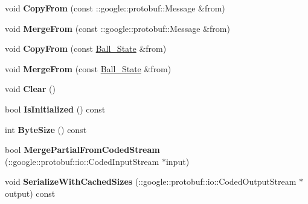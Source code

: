 \begin{DoxyCompactItemize}
\item 
void {\bfseries Copy\+From} (const \+::google\+::protobuf\+::\+Message \&from)\hypertarget{classvss__state_1_1Ball__State_a1b6e1fc62b0ed7f4a56f51107c2dea0c}{}\label{classvss__state_1_1Ball__State_a1b6e1fc62b0ed7f4a56f51107c2dea0c}

\item 
void {\bfseries Merge\+From} (const \+::google\+::protobuf\+::\+Message \&from)\hypertarget{classvss__state_1_1Ball__State_a23b0aa5fb0ead3fa0eb1d49f044a4108}{}\label{classvss__state_1_1Ball__State_a23b0aa5fb0ead3fa0eb1d49f044a4108}

\item 
void {\bfseries Copy\+From} (const \hyperlink{classvss__state_1_1Ball__State}{Ball\+\_\+\+State} \&from)\hypertarget{classvss__state_1_1Ball__State_abc6d9bde7cd19d33f5592fe7e89958f2}{}\label{classvss__state_1_1Ball__State_abc6d9bde7cd19d33f5592fe7e89958f2}

\item 
void {\bfseries Merge\+From} (const \hyperlink{classvss__state_1_1Ball__State}{Ball\+\_\+\+State} \&from)\hypertarget{classvss__state_1_1Ball__State_a6c0a4da68998dea51ba4971d3f3ae758}{}\label{classvss__state_1_1Ball__State_a6c0a4da68998dea51ba4971d3f3ae758}

\item 
void {\bfseries Clear} ()\hypertarget{classvss__state_1_1Ball__State_a23083679f69714534dff6d2fa4dfd69c}{}\label{classvss__state_1_1Ball__State_a23083679f69714534dff6d2fa4dfd69c}

\item 
bool {\bfseries Is\+Initialized} () const \hypertarget{classvss__state_1_1Ball__State_a86118bd22017a79d8bcecbb9759664ae}{}\label{classvss__state_1_1Ball__State_a86118bd22017a79d8bcecbb9759664ae}

\item 
int {\bfseries Byte\+Size} () const \hypertarget{classvss__state_1_1Ball__State_a37464e62ecce865fa9b7d71df18a6df2}{}\label{classvss__state_1_1Ball__State_a37464e62ecce865fa9b7d71df18a6df2}

\item 
bool {\bfseries Merge\+Partial\+From\+Coded\+Stream} (\+::google\+::protobuf\+::io\+::\+Coded\+Input\+Stream $\ast$input)\hypertarget{classvss__state_1_1Ball__State_a23384562e9b1779b7eae6df07fec8c08}{}\label{classvss__state_1_1Ball__State_a23384562e9b1779b7eae6df07fec8c08}

\item 
void {\bfseries Serialize\+With\+Cached\+Sizes} (\+::google\+::protobuf\+::io\+::\+Coded\+Output\+Stream $\ast$output) const \hypertarget{classvss__state_1_1Ball__State_ac9561ed1c347cc216c9adda156c8b1a7}{}\label{classvss__state_1_1Ball__State_ac9561ed1c347cc216c9adda156c8b1a7}


\end{DoxyCompactItemize}
